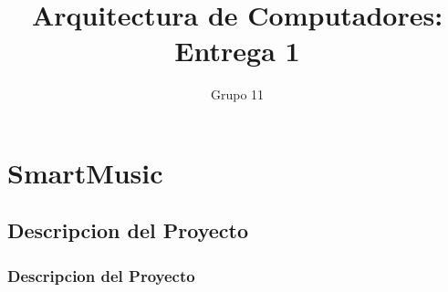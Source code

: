 \documentclass[11pt,slidestop,compress,mathserif]{beamer}
\title{Arquitectura de Computadores: Entrega 1}
\author{Grupo 11}
\institute{Pontificia Universidad Catolica de Chile}
\begin{document}
\begin{frame} %
\titlepage
\end{frame}
\section{SmartMusic} %
\subsection{Descripcion del Proyecto} %
\begin{frame}[options]
\frametitle{Descripcion del Proyecto}
\end{frame}
\end{document}

